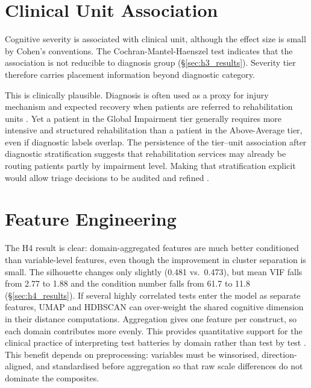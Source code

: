
\section{Clinical Unit Association}

Cognitive severity is associated with clinical unit, although the effect size is small by Cohen's conventions. The Cochran-Mantel-Haenszel test indicates that the association is not reducible to diagnosis group (§\ref{sec:h3_results}). Severity tier therefore carries placement information beyond diagnostic category.

This is clinically plausible. Diagnosis is often used as a proxy for injury mechanism and expected recovery when patients are referred to rehabilitation units \parencite{saatman2008classification, maas2017traumatic}. Yet a patient in the Global Impairment tier generally requires more intensive and structured rehabilitation than a patient in the Above-Average tier, even if diagnostic labels overlap. The persistence of the tier--unit association after diagnostic stratification suggests that rehabilitation services may already be routing patients partly by impairment level. Making that stratification explicit would allow triage decisions to be audited and refined \parencite{corrigan2010epidemiology}.


\section{Feature Engineering}

The H4 result is clear: domain-aggregated features are much better conditioned than variable-level features, even though the improvement in cluster separation is small. The silhouette changes only slightly (0.481 vs.\ 0.473), but mean VIF falls from 2.77 to 1.88 and the condition number falls from 61.7 to 11.8 (§\ref{sec:h4_results}). If several highly correlated tests enter the model as separate features, UMAP and HDBSCAN can over-weight the shared cognitive dimension in their distance computations. Aggregation gives one feature per construct, so each domain contributes more evenly. This provides quantitative support for the clinical practice of interpreting test batteries by domain rather than test by test \parencite{lezak2012neuropsychological}. This benefit depends on preprocessing: variables must be winsorised, direction-aligned, and standardised before aggregation so that raw scale differences do not dominate the composites.

